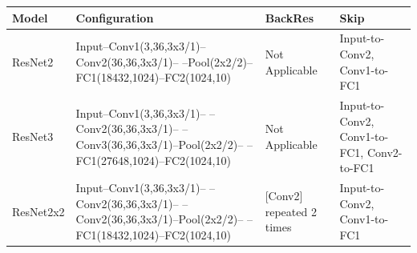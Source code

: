 \begin{tabular}{llll}
\toprule
Model & Configuration & BackRes & Skip \\
\midrule
ResNet2 & Input–Conv1(3,36,3x3/1)–Conv2(36,36,3x3/1)– –Pool(2x2/2)–FC1(18432,1024)–FC2(1024,10) & Not Applicable & Input-to-Conv2, Conv1-to-FC1 \\
ResNet3 & Input–Conv1(3,36,3x3/1)– –Conv2(36,36,3x3/1)– –Conv3(36,36,3x3/1)–Pool(2x2/2)– –FC1(27648,1024)–FC2(1024,10) & Not Applicable & Input-to-Conv2, Conv1-to-FC1, Conv2-to-FC1 \\
ResNet2x2 & Input–Conv1(3,36,3x3/1)– –Conv2(36,36,3x3/1)– –Conv2(36,36,3x3/1)–Pool(2x2/2)– –FC1(18432,1024)–FC2(1024,10) & [Conv2] repeated 2 times & Input-to-Conv2, Conv1-to-FC1 \\
\bottomrule
\end{tabular}
